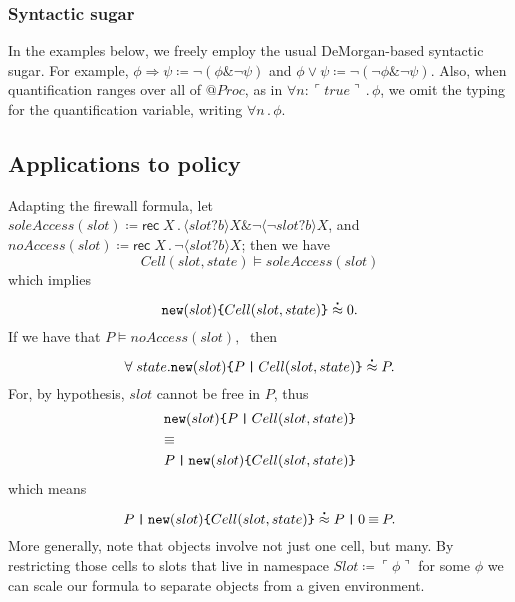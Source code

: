 \documentclass[submission,copyright,creativecommons]{eptcs}
\makeatletter
\newcommand{\lpquote}{\ulcorner}
\newcommand{\rpquote}{\urcorner}
\newcommand{\id}[1]{\texttt{#1}}
\newcommand{\juxtap}{\mathbin{\id{|}}}
\newcommand{\scong}{\mathbin{\equiv}}
\newcommand{\binpar}[2]{#1 \juxtap #2}
\newcommand{\quotep}[1]{@#1}
\newcommand{\QProc}{\quotep{\mathbin{Proc}}}
\newcommand{\defneqls}{\coloneqq}
\newcommand{\wbbisim}{\stackrel{\centerdot}{\approx}} %
\newcommand{\ptrue}{\mathbin{true}}
\newcommand{\pquotep}[1]{\lpquote #1 \rpquote}
\newcommand{\pprefix}[3]{\langle #1 ? #2 \rangle #3}
\newcommand{\pgfp}[2]{\textsf{rec} \; #1 \mathbin{.} #2}
\newcommand{\pquant}[3]{\forall #1 \mathbin{:} #2 \mathbin{.} #3}
\newcommand{\pquantuntyped}[2]{\forall #1 \mathbin{.} #2}
\numberwithin{equation}{subsection}
\makeatother
\begin{document}
\subsubsection{Syntactic sugar }

In the examples below, we freely employ the usual DeMorgan-based
syntactic sugar. For example, $\phi \Rightarrow \psi \defneqls \neg (
\phi \& \neg \psi )$ and $\phi \vee \psi \defneqls \neg ( \neg \phi \&
\neg \psi )$. Also, when quantification ranges over all of $\QProc$,
as in $\pquant{n}{\pquotep{\ptrue}}{\phi}$, we omit the typing for the
quantification variable, writing $\pquantuntyped{n}{\phi}$.

\subsection{Applications to policy}

Adapting the firewall formula, let $soleAccess( slot ) \defneqls
\pgfp{X}{\pprefix{slot}{b}{X} \& \neg \pprefix{\neg slot}{b}{X}}$, and
$noAccess( slot ) \defneqls \pgfp{X}{\neg \pprefix{slot}{b}{X}}$; then
we have
\[Cell (slot, state) \models soleAccess( slot )\]
which implies
\[{\mbox{\tt new}(slot)\mbox{\tt \{} Cell(slot, state) \mbox{\tt \}}}
\wbbisim 0.\]
If we have that $P \models noAccess( slot ), \;$ then 
\[\forall \; state . \mbox{\tt new}(slot)\mbox{\tt \{}
\binpar{P}{Cell(slot, state)} \mbox{\tt \}}\wbbisim P.\]
For, by hypothesis, $slot$ cannot be free in $P$, thus
\begin{equation*}
  \begin{aligned}
    & \mbox{\tt new}(slot)\mbox{\tt \{} \binpar{P}{Cell(slot, state)} \mbox{\tt \}}\\
    & \scong \\
    & \binpar{P}{\mbox{\tt new}(slot)\mbox{\tt \{} Cell(slot, state) \mbox{\tt \}}} \\
  \end{aligned}
\end{equation*}
\noindent which means
\[\binpar{P}{\mbox{\tt new}(slot)\mbox{\tt \{} Cell(slot, state)
  \mbox{\tt \}}} \wbbisim \binpar{P}{0} \scong P.\]
More generally, note that objects involve not just one cell, but
many. By restricting those cells to slots that live in namespace $Slot
\defneqls \pquotep{\phi}$ for some $\phi$ we can scale our formula to
separate objects from a given environment. 
\end{document}
